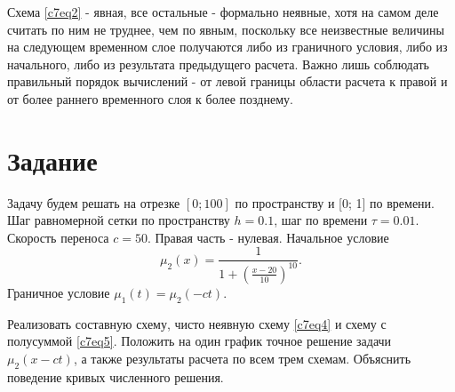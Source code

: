 Схема \eqref{c7eq2} - явная, все остальные - формально неявные, хотя на самом деле считать по ним не труднее, чем по явным, поскольку все неизвестные величины на следующем временном слое получаются либо из граничного условия, либо из начального, либо из результата предыдущего расчета. Важно лишь соблюдать правильный порядок вычислений - от левой границы области расчета к правой и от более раннего временного слоя к более позднему.

\section{Задание}
Задачу будем решать на отрезке  $[0; 100]$ по пространству и   [0; 1] по времени. Шаг равномерной сетки по пространству $h = 0.1$, шаг по времени $\tau = 0.01$. Скорость переноса $c = 50$. Правая часть - нулевая. Начальное условие
\begin{equation} \nonumber
	\mu_2(x) = \frac{1}{1 + \left( \displaystyle \frac{x-20}{10} \right)^{10}}.
\end{equation}
Граничное условие $\mu_1(t) = \mu_2(-ct)$.

Реализовать составную схему, чисто неявную схему \eqref{c7eq4} и схему с полусуммой \eqref{c7eq5}. Положить на один график точное решение задачи $\mu_2(x-ct)$, а также результаты расчета по всем трем схемам. Объяснить поведение кривых численного решения.
